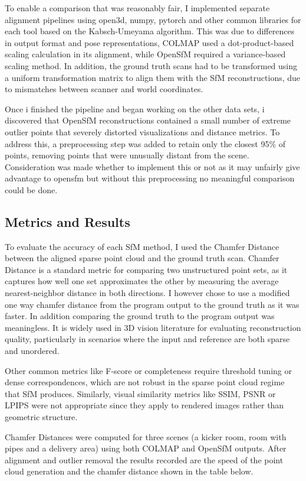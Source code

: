 \documentclass[10pt,twocolumn]{article}
\begin{document}
To enable a comparison that was reasonably fair, I implemented separate alignment pipelines using open3d, numpy, pytorch and other common libraries for each tool based on the Kabsch-Umeyama algorithm. This was due to differences in output format and pose representations, COLMAP used a dot-product-based scaling calculation in its alignment, while OpenSfM required a variance-based scaling method. In addition, the ground truth scans had to be transformed using a uniform transformation matrix to align them with the SfM reconstructions, due to mismatches between scanner and world coordinates.

Once i finished the pipeline and began working on the other data sets, i discovered that OpenSfM reconstructions contained a small number of extreme outlier points that severely distorted visualizations and distance metrics. To address this, a preprocessing step was added to retain only the closest 95\% of points, removing points that were unusually distant from the scene. Consideration was made whether to implement this or not as it may unfairly give advantage to opensfm but without this preprocessing no meaningful comparison could be done.

\subsection{Metrics and Results}
To evaluate the accuracy of each SfM method, I used the Chamfer Distance between the aligned sparse point cloud and the ground truth scan. Chamfer Distance is a standard metric for comparing two unstructured point sets, as it captures how well one set approximates the other by measuring the average nearest-neighbor distance in both directions. I however chose to use a modified one way chamfer distance from the program output to the ground truth as it was faster. In addition comparing the ground truth to the program output was meaningless. It is widely used in 3D vision literature for evaluating reconstruction quality, particularly in scenarios where the input and reference are both sparse and unordered.

Other common metrics like F-score or completeness require threshold tuning or dense correspondences, which are not robust in the sparse point cloud regime that SfM produces. Similarly, visual similarity metrics like SSIM, PSNR or LPIPS were not appropriate since they apply to rendered images rather than geometric structure.

Chamfer Distances were computed for three scenes (a kicker room, room with pipes and a delivery area) using both COLMAP and OpenSfM outputs. After alignment and outlier removal the results recorded are the speed of the point cloud generation and the chamfer distance shown in the table below.
\end{document}
